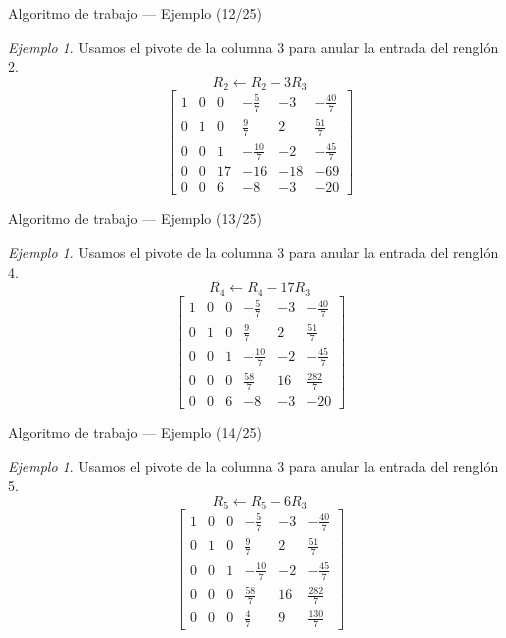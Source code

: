 \documentclass[aspectratio=169,11pt]{beamer}
\theoremstyle{remark}
\newtheorem{Ejem}[definicion]{Ejemplo}
\begin{document}
\begin{frame}{Algoritmo de trabajo — Ejemplo (12/25)}
\begin{Ejem}
Usamos el pivote de la columna 3 para anular la entrada del renglón 2.
\[
R_{2}\leftarrow R_{2}-3R_{3}
\]
\[
\left[\begin{array}{ccccc|c}
1 & 0 & 0 & - \frac{5}{7} & -3 & - \frac{40}{7}\\
0 & 1 & 0 & \frac{9}{7} & 2 & \frac{51}{7}\\
0 & 0 & 1 & - \frac{10}{7} & -2 & - \frac{45}{7}\\
0 & 0 & 17 & -16 & -18 & -69\\
0 & 0 & 6 & -8 & -3 & -20
\end{array}\right]
\]
\end{Ejem}
\end{frame}

\begin{frame}{Algoritmo de trabajo — Ejemplo (13/25)}
\begin{Ejem}
Usamos el pivote de la columna 3 para anular la entrada del renglón 4.
\[
R_{4}\leftarrow R_{4}-17R_{3}
\]
\[
\left[\begin{array}{ccccc|c}
1 & 0 & 0 & - \frac{5}{7} & -3 & - \frac{40}{7}\\
0 & 1 & 0 & \frac{9}{7} & 2 & \frac{51}{7}\\
0 & 0 & 1 & - \frac{10}{7} & -2 & - \frac{45}{7}\\
0 & 0 & 0 & \frac{58}{7} & 16 & \frac{282}{7}\\
0 & 0 & 6 & -8 & -3 & -20
\end{array}\right]
\]
\end{Ejem}
\end{frame}

\begin{frame}{Algoritmo de trabajo — Ejemplo (14/25)}
\begin{Ejem}
Usamos el pivote de la columna 3 para anular la entrada del renglón 5.
\[
R_{5}\leftarrow R_{5}-6R_{3}
\]
\[
\left[\begin{array}{ccccc|c}
1 & 0 & 0 & - \frac{5}{7} & -3 & - \frac{40}{7}\\
0 & 1 & 0 & \frac{9}{7} & 2 & \frac{51}{7}\\
0 & 0 & 1 & - \frac{10}{7} & -2 & - \frac{45}{7}\\
0 & 0 & 0 & \frac{58}{7} & 16 & \frac{282}{7}\\
0 & 0 & 0 & \frac{4}{7} & 9 & \frac{130}{7}
\end{array}\right]
\]
\end{Ejem}
\end{frame}
\end{document}
